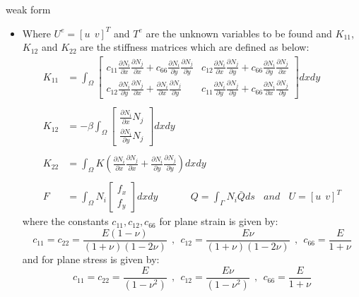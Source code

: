 \documentclass{beamer}
\begin{document}
\begin{frame}[t,fragile]{weak form}
    \tiny
    \begin{itemize}
        \item Where $U^e=[u~ ~ v]^T$ and $T^e$ are the unknown variables to be found and $K_{11}$, $K_{12}$ and $K_{22}$ are the stiffness matrices which are defined as below:\\  
\begin{align*}
K_{11}&=\int_{\Omega}^{}
\begin{bmatrix}
    c_{11}\frac{\partial N_i}{\partial x}\frac{\partial N_j}{\partial x}+c_{66}\frac{\partial N_i}{\partial y}\frac{\partial N_j}{\partial y} & c_{12}\frac{\partial N_i}{\partial x}\frac{\partial N_j}{\partial y}+c_{66}\frac{\partial N_i}{\partial y}\frac{\partial N_j}{\partial x}\\
    c_{12}\frac{\partial N_i}{\partial y}\frac{\partial N_j}{\partial x}+\frac{\partial N_i}{\partial x}\frac{\partial N_j}{\partial y}& c_{11}\frac{\partial N_i}{\partial y}\frac{\partial N_j}{\partial y}+c_{66}\frac{\partial N_i}{\partial x}\frac{\partial N_j}{\partial y}
\end{bmatrix}dxdy\\\\
K_{12}&=-\beta\int_{\Omega}^{}
\begin{bmatrix}
    \frac{\partial N_i}{\partial x}N_j \\ \frac{\partial N_i}{\partial y}N_j
\end{bmatrix}dxdy\\\\
K_{22}&=\int_{\Omega}^{}K\left( \frac{\partial N_i}{\partial x}\frac{\partial N_j}{\partial x}+\frac{\partial N_i}{\partial y}\frac{\partial N_j}{\partial y} \right)dxdy\\\\
F&= \int_{\Omega} N_i \begin{bmatrix} f_x\\f_y \end{bmatrix}dxdy~ ~ ~ ~ ~ ~ ~ ~ ~  ~ ~~ ~ ~ ~
Q=\int_{\Gamma}N_i\bar{Q}ds~ ~ ~ ~ and~ ~ ~ ~ U=[u~ ~ v]^T
\end{align*}
where the constants $c_{11}, c_{12}, c_{66}$
for plane strain is given by:
$$c_{11}=c_{22}=\frac{E(1-\nu)}{(1+\nu)(1-2\nu)}~ ~ ,~ ~ c_{12}=\frac{E\nu}{(1+\nu)(1-2\nu)}~ ~,~  ~ c_{66}=\frac{E}{1+\nu}$$
and for plane stress is given by: 
$$c_{11}=c_{22}=\frac{E}{(1-\nu^2)}~ ~ ,~ ~ c_{12}=\frac{E\nu}{(1-\nu^2)}~ ~,~  ~ c_{66}=\frac{E}{1+\nu}$$
\end{itemize}
\end{frame}
\end{document}
